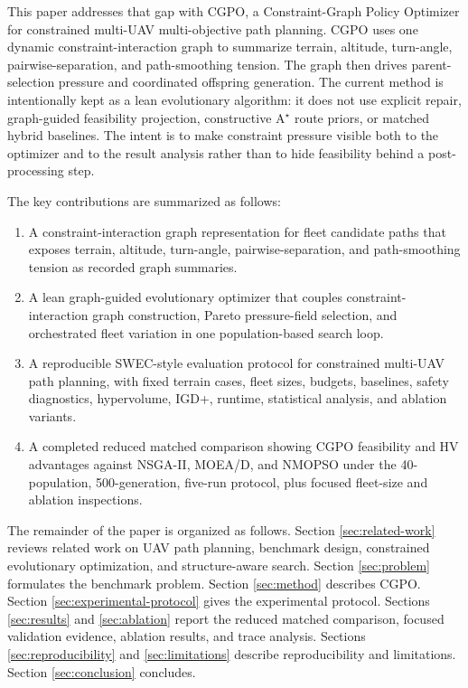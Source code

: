 \documentclass[a4paper,fleqn]{cas-dc}
\begin{document}
This paper addresses that gap with CGPO, a Constraint-Graph Policy Optimizer for constrained multi-UAV multi-objective path planning. CGPO uses one dynamic constraint-interaction graph to summarize terrain, altitude, turn-angle, pairwise-separation, and path-smoothing tension. The graph then drives parent-selection pressure and coordinated offspring generation. The current method is intentionally kept as a lean evolutionary algorithm: it does not use explicit repair, graph-guided feasibility projection, constructive A$^\star$ route priors, or matched hybrid baselines. The intent is to make constraint pressure visible both to the optimizer and to the result analysis rather than to hide feasibility behind a post-processing step.

The key contributions are summarized as follows:
\begin{enumerate}
\item A constraint-interaction graph representation for fleet candidate paths that exposes terrain, altitude, turn-angle, pairwise-separation, and path-smoothing tension as recorded graph summaries.
\item A lean graph-guided evolutionary optimizer that couples constraint-interaction graph construction, Pareto pressure-field selection, and orchestrated fleet variation in one population-based search loop.
\item A reproducible SWEC-style evaluation protocol for constrained multi-UAV path planning, with fixed terrain cases, fleet sizes, budgets, baselines, safety diagnostics, hypervolume, IGD+, runtime, statistical analysis, and ablation variants.
\item A completed reduced matched comparison showing CGPO feasibility and HV advantages against NSGA-II, MOEA/D, and NMOPSO under the 40-population, 500-generation, five-run protocol, plus focused fleet-size and ablation inspections.
\end{enumerate}

The remainder of the paper is organized as follows. Section \ref{sec:related-work} reviews related work on UAV path planning, benchmark design, constrained evolutionary optimization, and structure-aware search. Section \ref{sec:problem} formulates the benchmark problem. Section \ref{sec:method} describes CGPO. Section \ref{sec:experimental-protocol} gives the experimental protocol. Sections \ref{sec:results} and \ref{sec:ablation} report the reduced matched comparison, focused validation evidence, ablation results, and trace analysis. Sections \ref{sec:reproducibility} and \ref{sec:limitations} describe reproducibility and limitations. Section \ref{sec:conclusion} concludes.
\end{document}
